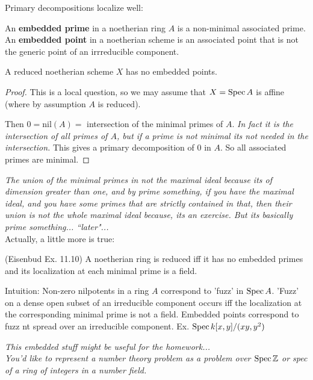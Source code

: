 Primary decompositions localize well: \begin{definition} An
\textbf{embedded prime} in a noetherian ring $A$ is a non-minimal
associated prime. An \textbf{embedded point} in a noetherian
scheme is an associated point that is not the generic point of an
irrreducible component. \end{definition}

\begin{proposition} A reduced noetherian scheme $X$ has no
embedded points. \end{proposition} \begin{proof} This is a local
question, so we may assume that $X = \text{\rm Spec\,}{A}$ is affine (where by
assumption $A$ is reduced).

Then $0 = \text{nil}(A) = $ intersection of the minimal primes of
$A$. \emph{In fact it is the intersection of all primes of $A$,
but if a prime is not minimal its not needed in the intersection.}
This gives a primary decomposition of $0$ in $A$. So all
associated primes are minimal. \end{proof}

\emph{The union of the minimal primes in not the maximal ideal
because its of dimension greater than one, and by prime something,
if you have the maximal ideal, and you have some primes that are
strictly contained in that, then their union is not the whole
maximal ideal because, its an exercise. But its basically prime
something... ``later"...}\\

Actually, a little more is true:

\begin{remark} (Eisenbud Ex. 11.10) A noetherian ring is reduced
iff it has no embedded primes and its localization at each minimal
prime is a field.

Intuition: Non-zero nilpotents in a ring $A$ correspond to 'fuzz'
in $\text{\rm Spec\,}{A}$. 'Fuzz' on a dense open subset of an irreducible
component occurs iff the localization at the corresponding minimal
prime is not a field. Embedded points correspond to fuzz nt spread
over an irreducible component. Ex.
$\text{\rm Spec\,}{k[x,y]/(xy,y^2)}$\end{remark}

\emph{This embedded stuff might be useful for the homework...}\\

\emph{You'd like to represent a number theory problem as a problem
over $\text{\rm Spec\,}{\mathbb{Z}}$ or spec of a ring of integers in a number field.}\\


